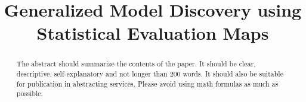 \documentclass[aos]{imsart}
\numberwithin{equation}{section}
\begin{document}
\newtheorem{Theorem}{Theorem}[section]
\newtheorem{Lemma}[Theorem]{Lemma}
\newtheorem{Corollary}[Theorem]{Corollary}
\newtheorem{Proposition}[Theorem]{Proposition}
\newtheorem{Conjecture}[Theorem]{Conjecture}
\theoremstyle{definition} \newtheorem{Definition}[Theorem]{Definition}
\theoremstyle{definition} \newtheorem{Example}[Theorem]{Example}


\begin{frontmatter}
\title{Generalized Model Discovery using Statistical Evaluation Maps}


\begin{abstract}
The abstract should summarize the contents of the paper.
It should be clear, descriptive, self-explanatory and not longer
than 200 words. It should also be suitable for publication in
abstracting services. Please avoid using math formulas as much as possible.


\end{abstract}
\end{frontmatter}
\end{document}
